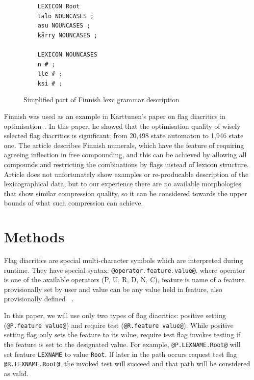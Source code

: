 \documentclass[11pt]{article}
\begin{document}
\begin{figure}
    \centering
    \begin{verbatim}
    LEXICON Root
    talo NOUNCASES ;
    asu NOUNCASES ;
    kärry NOUNCASES ;

    LEXICON NOUNCASES
    n # ;
    lle # ;
    ksi # ;
    \end{verbatim}
    \caption{Simplified part of Finnish lexc grammar description
    \label{fig:lexc-fin}}
\end{figure}

Finnish was used as an example in Karttunen's paper on flag diacritics in
optimisation~. In this paper, he showed that
the optimisation quality of wisely selected flag diacritics is significant;
from 20,498 state automaton to 1,946 state one. The article describes Finnish
numerals, which have the feature of requiring agreeing inflection in free
compounding, and this can be achieved by allowing all compounds and restricting
the combinations by flags instead of lexicon structure. Article does not
unfortunately show examples or re-producable description of the lexicographical
data, but to our experience there are no available morphologies that show
similar compression quality, so it can be considered towards the upper bounds
of what such compression can achieve.
 

\section{Methods}
\label{sec:methods}

Flag diacritics are special multi-character symbols which are interpreted during runtime. They have special syntax: \verb+@operator.feature.value@+, where operator is one of the available operators (P, U, R, D, N, C), feature is name of a feature provisionally set by user and value can be any value held in feature, also provisionally defined ~\cite{beesley2003finite}.

In this paper, we will use only two types of flag diacritics: positive setting (\verb+@P.feature value@+) and require test (\verb+@R.feature value@+). While positive setting flag only sets the feature to its value, require test flag invokes testing if the feature is set to the designated value.
For example, \verb+@P.LEXNAME.Root@+ will set feature \texttt{LEXNAME} to value \texttt{Root}. If later in the path occurs request test flag \verb+@R.LEXNAME.Root@+, the invoked test will succeed and that path will be considered as valid. 
\end{document}
